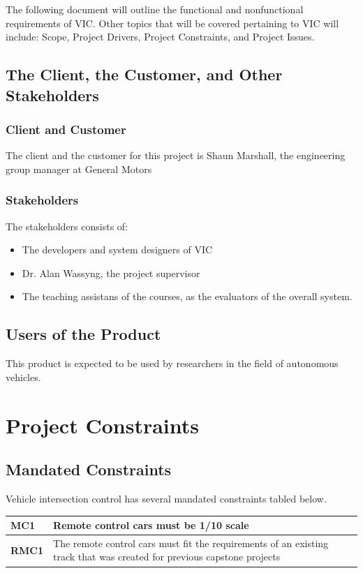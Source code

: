 \documentclass [12pt]{article}
\begin{document}
The following document will outline the functional and nonfunctional requirements of VIC.  Other topics that will be covered pertaining to VIC will include: Scope, Project Drivers, Project Constraints, and Project Issues.

\subsection{The Client, the Customer, and Other Stakeholders}

\subsubsection{Client and Customer}
	The client and the customer for this project is Shaun Marshall, the engineering group manager at General Motors


\subsubsection{Stakeholders}
 
 	The stakeholders consists of:
 		\begin{itemize}

 		\item The developers and system designers of VIC
 		\item Dr. Alan Wassyng, the project supervisor
 		\item The teaching assistans of the courses, as the evaluators of the overall system.
 		\end{itemize} 

\subsection{Users of the Product} 

This product is expected to be used by researchers in the field of autonomous vehicles.



\section{\textbf{Project Constraints}}


\subsection{Mandated Constraints}
Vehicle intersection control has several mandated constraints tabled below. 
\begin{longtable}{| p{ } | p{ } | }\hline 
\textbf{MC1} & \textbf{Remote control cars must be 1/10 scale} \\ \hline
\textbf{RMC1} & The remote control cars must fit the requirements of an existing track that was created for previous capstone projects\\ \hline 

\end{longtable}
\end{document}

